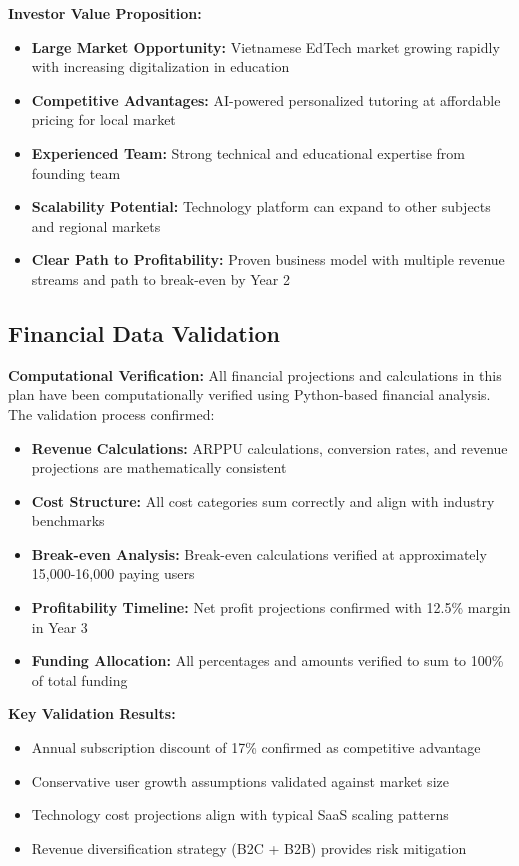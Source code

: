\textbf{Investor Value Proposition:}
\begin{itemize}
    \item \textbf{Large Market Opportunity:} Vietnamese EdTech market growing rapidly with increasing digitalization in education
    \item \textbf{Competitive Advantages:} AI-powered personalized tutoring at affordable pricing for local market
    \item \textbf{Experienced Team:} Strong technical and educational expertise from founding team
    \item \textbf{Scalability Potential:} Technology platform can expand to other subjects and regional markets
    \item \textbf{Clear Path to Profitability:} Proven business model with multiple revenue streams and path to break-even by Year 2
\end{itemize}

\subsection{Financial Data Validation}
\textbf{Computational Verification:}
All financial projections and calculations in this plan have been computationally verified using Python-based financial analysis. The validation process confirmed:

\begin{itemize}
    \item \textbf{Revenue Calculations:} ARPPU calculations, conversion rates, and revenue projections are mathematically consistent
    \item \textbf{Cost Structure:} All cost categories sum correctly and align with industry benchmarks
    \item \textbf{Break-even Analysis:} Break-even calculations verified at approximately 15,000-16,000 paying users
    \item \textbf{Profitability Timeline:} Net profit projections confirmed with 12.5\% margin in Year 3
    \item \textbf{Funding Allocation:} All percentages and amounts verified to sum to 100\% of total funding
\end{itemize}

\textbf{Key Validation Results:}
\begin{itemize}
    \item Annual subscription discount of 17\% confirmed as competitive advantage
    \item Conservative user growth assumptions validated against market size
    \item Technology cost projections align with typical SaaS scaling patterns
    \item Revenue diversification strategy (B2C + B2B) provides risk mitigation
\end{itemize}

